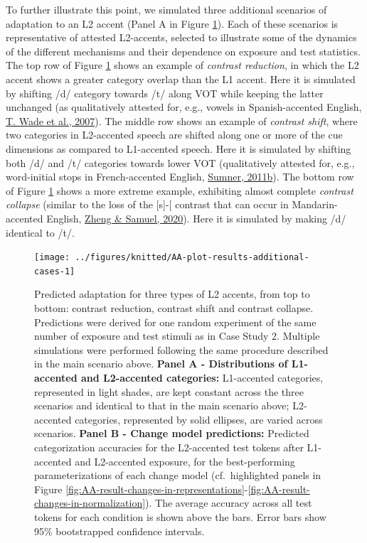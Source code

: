\documentclass[
  11pt,
  english,
  man,floatsintext]{apa6}
\begin{document}
To further illustrate this point, we simulated three additional scenarios of adaptation to an L2 accent (Panel A in Figure \ref{fig:AA-plot-results-additional-cases}). Each of these scenarios is representative of attested L2-accents, selected to illustrate some of the dynamics of the different mechanisms and their dependence on exposure and test statistics. The top row of Figure \ref{fig:AA-plot-results-additional-cases} shows an example of \emph{contrast reduction}, in which the L2 accent shows a greater category overlap than the L1 accent. Here it is simulated by shifting /d/ category towards /t/ along VOT while keeping the latter unchanged (as qualitatively attested for, e.g., vowels in Spanish-accented English, \protect\hyperlink{ref-wade2007}{T. Wade et al., 2007}). The middle row shows an example of \emph{contrast shift}, where two categories in L2-accented speech are shifted along one or more of the cue dimensions as compared to L1-accented speech. Here it is simulated by shifting both /d/ and /t/ categories towards lower VOT (qualitatively attested for, e.g., word-initial stops in French-accented English, \protect\hyperlink{ref-Sumner2011a}{Sumner, 2011b}). The bottom row of Figure \ref{fig:AA-plot-results-additional-cases} shows a more extreme example, exhibiting almost complete \emph{contrast collapse} (similar to the loss of the {[}s{]}-{[}\ipatext{θ}{]} contrast that can occur in Mandarin-accented English, \protect\hyperlink{ref-zheng-samuel2020}{Zheng \& Samuel, 2020}). Here it is simulated by making /d/ identical to /t/.



\begin{figure}

{\centering \texttt{[image: ../figures/knitted/AA-plot-results-additional-cases-1]} 

}

\caption{Predicted adaptation for three types of L2 accents, from top to bottom: contrast reduction, contrast shift and contrast collapse. Predictions were derived for one random experiment of the same number of exposure and test stimuli as in Case Study 2. Multiple simulations were performed following the same procedure described in the main scenario above. \textbf{Panel A - Distributions of L1-accented and L2-accented categories:} L1-accented categories, represented in light shades, are kept constant across the three scenarios and identical to that in the main scenario above; L2-accented categories, represented by solid ellipses, are varied across scenarios. \textbf{Panel B - Change model predictions:} Predicted categorization accuracies for the L2-accented test tokens after L1-accented and L2-accented exposure, for the best-performing parameterizations of each change model (cf.~highlighted panels in Figure \ref{fig:AA-result-changes-in-representations}-\ref{fig:AA-result-changes-in-normalization}). The average accuracy across all test tokens for each condition is shown above the bars. Error bars show 95\% bootstrapped confidence intervals.}\label{fig:AA-plot-results-additional-cases}
\end{figure}
\end{document}
